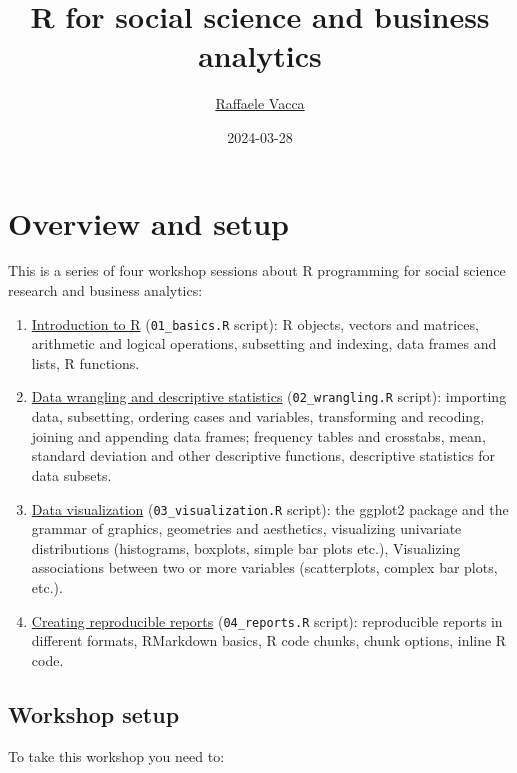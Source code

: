 \documentclass[
]{book}
\title{R for social science and business analytics}
\author{\href{http://www.raffaelevacca.com/}{Raffaele Vacca}}
\date{2024-03-28}
\providecommand{\tightlist}{%
  \setlength{\itemsep}{0pt}\setlength{\parskip}{0pt}}
\begin{document}
\maketitle

{
\setcounter{tocdepth}{1}
\tableofcontents
}
\hypertarget{overview-and-setup}{%
\chapter{Overview and setup}\label{overview-and-setup}}

This is a series of four workshop sessions about R programming for social science research and business analytics:

\begin{enumerate}
\def\labelenumi{\arabic{enumi}.}
\tightlist
\item
  \protect\hyperlink{intro}{Introduction to R} (\texttt{01\_basics.R} script): R objects, vectors and matrices, arithmetic and logical operations, subsetting and indexing, data frames and lists, R functions.
\item
  \protect\hyperlink{wrangling}{Data wrangling and descriptive statistics} (\texttt{02\_wrangling.R} script): importing data, subsetting, ordering cases and variables, transforming and recoding, joining and appending data frames; frequency tables and crosstabs, mean, standard deviation and other descriptive functions, descriptive statistics for data subsets.
\item
  \protect\hyperlink{visualization}{Data visualization} (\texttt{03\_visualization.R} script): the ggplot2 package and the grammar of graphics, geometries and aesthetics, visualizing univariate distributions (histograms, boxplots, simple bar plots etc.), Visualizing associations between two or more variables (scatterplots, complex bar plots, etc.).
\item
  \protect\hyperlink{reproducible}{Creating reproducible reports} (\texttt{04\_reports.R} script): reproducible reports in different formats, RMarkdown basics, R code chunks, chunk options, inline R code.
\end{enumerate}

\hypertarget{setup}{%
\section{Workshop setup}\label{setup}}

To take this workshop you need to:
\end{document}
